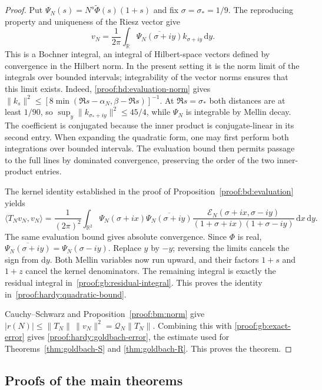 \documentclass[12pt,a4paper]{amsart}
\numberwithin{equation}{section}
\def\le{\leqslant}
\theoremstyle{plain}
\theoremstyle{definition}
\theoremstyle{remark}
\begin{document}
\begin{proof}
Put $\Psi_N(s)=N^s\widetilde\Phi(s)(1+s)$ and fix
$\sigma=\sigma_*=1/9$. The reproducing property and uniqueness of
the Riesz vector give
\[
 v_N=\frac1{2\pi}\int_{\mathbb R}
       \overline{\Psi_N(\sigma+iy)}k_{\sigma+iy}\,\mathrm{d}y.
\]
This is a Bochner integral, an integral of Hilbert-space vectors
defined by convergence in the Hilbert norm. In the present setting
it is the norm limit of the integrals over bounded intervals;
integrability of the vector norms ensures that this limit exists.
Indeed, \eqref{proof:hd:evaluation-norm} gives
$\|k_s\|^2\le[8\min(\Re s-\alpha_N,\beta-\Re s)]^{-1}$.
At $\Re s=\sigma_*$ both distances are at least $1/90$, so
$\sup_y\|k_{\sigma_*+iy}\|^2\le45/4$, while $\Psi_N$ is integrable
by Mellin decay. The coefficient is conjugated because the inner product
is conjugate-linear in its second entry.
When expanding the quadratic form, one may first perform both integrations
over bounded intervals.
The evaluation bound then permits passage to the full lines by dominated
convergence, preserving the order of the two inner-product entries.

The kernel identity established in the proof of
Proposition~\ref{proof:bd:evaluation} yields
\[
 \langle T_Nv_N,v_N\rangle
 =\frac1{(2\pi)^2}\int_{\mathbb R^2}
 \Psi_N(\sigma+ix)\overline{\Psi_N(\sigma+iy)}
 \frac{\mathscr E_N(\sigma+ix,\sigma-iy)}
      {(1+\sigma+ix)(1+\sigma-iy)}\,\mathrm{d}x\,\mathrm{d}y.
\]
The same evaluation bound gives absolute convergence. Since $\Phi$
is real, $\overline{\Psi_N(\sigma+iy)}=\Psi_N(\sigma-iy)$.
Replace $y$ by $-y$; reversing the limits cancels the sign from $\mathrm{d}y$.
Both Mellin variables now run upward, and their factors $1+s$ and
$1+z$ cancel the kernel denominators. The remaining integral is
exactly the residual integral in~\eqref{proof:gb:residual-integral}.
This proves the identity in~\eqref{proof:hardy:quadratic-bound}.

Cauchy--Schwarz and Proposition~\ref{proof:bm:norm} give
$|r(N)|\le\|T_N\|\,\|v_N\|^2=\mathcal Q_N\|T_N\|$.
Combining this with \eqref{proof:gb:exact-error} gives
\eqref{proof:hardy:goldbach-error}, the estimate used for
Theorems~\ref{thm:goldbach-S} and \ref{thm:goldbach-R}.
This proves the theorem.
\end{proof}

\subsection{Proofs of the main theorems}
\label{proof:main-theorem-proofs}
\label{proof:v7:siegel-hypothesis}\label{proof:v7:riemann-hypothesis}
\end{document}
